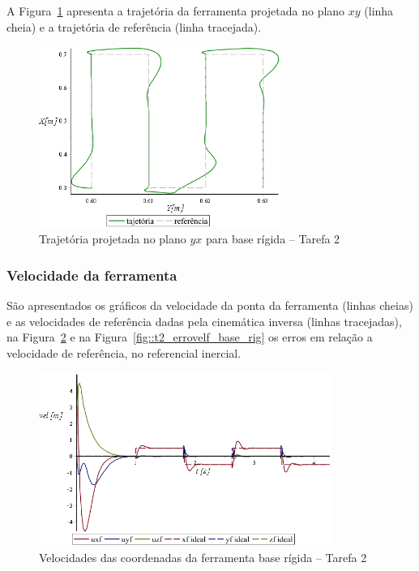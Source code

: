 A Figura~\ref{fig::t2_traj_base_rig} apresenta a trajetória da ferramenta
projetada no plano $xy$ (linha cheia) e a trajetória de referência (linha
tracejada).

\begin{figure}[h]
	\centering 
 	\includegraphics[width=0.70\textwidth]{figs/t2_traj_base_rig}
 	\caption{Trajetória projetada no plano $yx$ para base rígida -- Tarefa 2}
 	\label{fig::t2_traj_base_rig}
\end{figure}


\subsubsection{Velocidade da ferramenta}

São apresentados os gráficos da velocidade da ponta da ferramenta (linhas
cheias) e as velocidades de referência dadas pela cinemática inversa (linhas
tracejadas), na Figura~\ref{fig::t2_velf_base_rig} e na
Figura~\ref{fig::t2_errovelf_base_rig} os erros em relação a velocidade de
referência, no referencial inercial.

\begin{figure}[h]
	\centering 
 	\includegraphics[width=0.85\textwidth]{figs/t2_velf_base_rig}
 	\caption{Velocidades das coordenadas da ferramenta base rígida -- Tarefa
 	2}
 	\label{fig::t2_velf_base_rig}
\end{figure}

